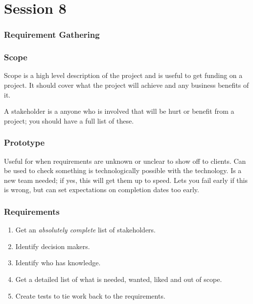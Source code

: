 \section{Session 8}\label{sec:session_8}

\subsubsection{Requirement Gathering}\label{ssub:requirement_gathering}

\subsubsection{Scope}\label{ssub:scope}

Scope is a high level description of the project and is useful to get funding on a project.
It should cover what the project will achieve and any business benefits of it.

A stakeholder is a anyone who is involved that will be hurt or benefit from a project; you should have a full list of these.

\subsubsection{Prototype}\label{ssub:prototype}

Useful for when requirements are unknown or unclear to show off to clients.
Can be used to check something is technologically possible with the technology.
Is a new team needed; if yes, this will get them up to speed.
Lets you fail early if this is wrong, but can set expectations on completion dates too early.

\subsubsection{Requirements}\label{ssub:requirements}

\begin{enumerate}
	\item Get an \emph{absolutely complete} list of stakeholders.
	\item Identify decision makers.
	\item Identify who has knowledge.
	\item Get a detailed list of what is needed, wanted, liked and out of scope.
	\item Create tests to tie work back to the requirements.
\end{enumerate}

